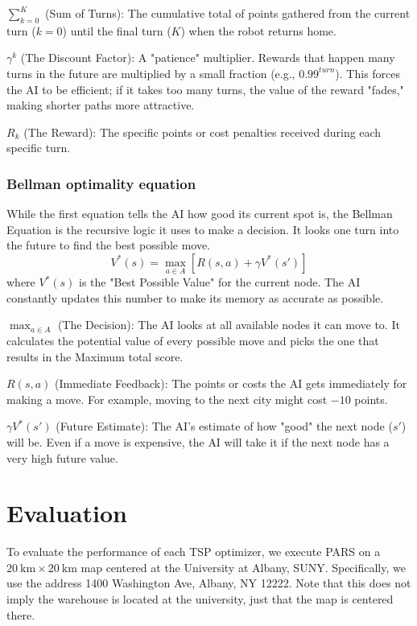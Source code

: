 \documentclass[conference]{IEEEtran}
\begin{document}
$\sum_{k=0}^{K}$ (Sum of Turns): The cumulative total of points gathered from the current turn ($k=0$) until the final turn ($K$) when the robot returns home.

$\gamma^k$ (The Discount Factor): A "patience" multiplier. Rewards that happen many turns in the future are multiplied by a small fraction (e.g., $0.99^{turn}$). This forces the AI to be efficient; if it takes too many turns, the value of the reward "fades," making shorter paths more attractive.

$R_k$ (The Reward): The specific points or cost penalties received during each specific turn.

\subsubsection{Bellman optimality equation}

While the first equation tells the AI how good its current spot is, the Bellman Equation is the recursive logic it uses to make a decision. It looks one turn into the future to find the best possible move.
\[
    V^*(s) = \max_{a \in A} \left[ R(s, a) + \gamma V^*(s') \right]
\]
where $V^*(s)$ is the "Best Possible Value" for the current node. The AI constantly updates this number to make its memory as accurate as possible.

$\max_{a \in A}$ (The Decision): The AI looks at all available nodes it can move to. It calculates the potential value of every possible move and picks the one that results in the Maximum total score.

$R(s, a)$ (Immediate Feedback): The points or costs the AI gets immediately for making a move. For example, moving to the next city might cost $-10$ points.

$\gamma V^*(s')$ (Future Estimate): The AI's estimate of how "good" the next node ($s'$) will be. Even if a move is expensive, the AI will take it if the next node has a very high future value.

\section{Evaluation}

To evaluate the performance of each TSP optimizer, we execute PARS on a $\qty{20}{\km}\times\qty{20}{\km}$ map centered at the University at Albany, SUNY. Specifically, we use the address 1400 Washington Ave, Albany, NY 12222. Note that this does not imply the warehouse is located at the university, just that the map is centered there.
\end{document}
